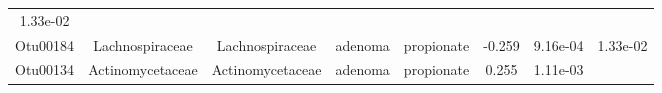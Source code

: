 \documentclass[11pt,]{article}
\begin{document}
\begin{longtable}[]{@{}cccccccc@{}}
\begin{minipage}[t]{0.08\columnwidth}
1.33e-02\strut
\end{minipage}\tabularnewline
\begin{minipage}[t]{0.08\columnwidth}\centering\strut
Otu00184\strut
\end{minipage} & \begin{minipage}[t]{0.15\columnwidth}\centering\strut
Lachnospiraceae\strut
\end{minipage} & \begin{minipage}[t]{0.15\columnwidth}\centering\strut
Lachnospiraceae\strut
\end{minipage} & \begin{minipage}[t]{0.08\columnwidth}\centering\strut
adenoma\strut
\end{minipage} & \begin{minipage}[t]{0.09\columnwidth}\centering\strut
propionate\strut
\end{minipage} & \begin{minipage}[t]{0.07\columnwidth}\centering\strut
-0.259\strut
\end{minipage} & \begin{minipage}[t]{0.08\columnwidth}\centering\strut
9.16e-04\strut
\end{minipage} & \begin{minipage}[t]{0.08\columnwidth}\centering\strut
1.33e-02\strut
\end{minipage}\tabularnewline
\begin{minipage}[t]{0.08\columnwidth}\centering\strut
Otu00134\strut
\end{minipage} & \begin{minipage}[t]{0.15\columnwidth}\centering\strut
Actinomycetaceae\strut
\end{minipage} & \begin{minipage}[t]{0.15\columnwidth}\centering\strut
Actinomycetaceae\strut
\end{minipage} & \begin{minipage}[t]{0.08\columnwidth}\centering\strut
adenoma\strut
\end{minipage} & \begin{minipage}[t]{0.09\columnwidth}\centering\strut
propionate\strut
\end{minipage} & \begin{minipage}[t]{0.07\columnwidth}\centering\strut
0.255\strut
\end{minipage} & \begin{minipage}[t]{0.08\columnwidth}\centering\strut
1.11e-03\strut
\end{minipage} & \begin{minipage}[t]{0.08\columnwidth}\centering\strut

\end{minipage}
\end{longtable}
\end{document}
